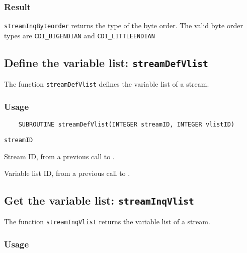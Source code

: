 \subsubsection*{Result}

{\tt streamInqByteorder} returns the type of the byte order.
The valid {\CDI} byte order types are {\tt CDI\_BIGENDIAN} and {\tt CDI\_LITTLEENDIAN}



\subsection{Define the variable list: {\tt streamDefVlist}}
\label{streamDefVlist}

The function {\tt streamDefVlist} defines the variable list of a stream.

\subsubsection*{Usage}

\begin{verbatim}
    SUBROUTINE streamDefVlist(INTEGER streamID, INTEGER vlistID)
\end{verbatim}

\hspace*{4mm}\begin{minipage}[]{15cm}
\begin{deflist}{\tt streamID\ }
\item[{\tt streamID}]
Stream ID, from a previous call to {}.
\item[{\tt vlistID}]
Variable list ID, from a previous call to {}.

\end{deflist}
\end{minipage}


\subsection{Get the variable list: {\tt streamInqVlist}}
\label{streamInqVlist}

The function {\tt streamInqVlist} returns the variable list of a stream.

\subsubsection*{Usage}


